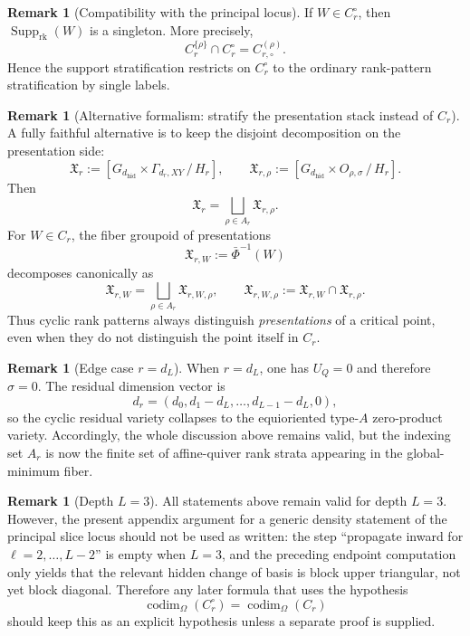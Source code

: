 \documentclass{article}
\newcommand{\Supp}{\operatorname{Supp}}
\theoremstyle{definition}
\newtheorem{remark}[theorem]{Remark}
\begin{document}
\begin{remark}[Compatibility with the principal locus]
If \(W\in C_r^{\circ}\), then \(\Supp_{\mathrm{rk}}(W)\) is a singleton. More precisely,
\[
C_r^{\{\rho\}}\cap C_r^{\circ}=C_{r,\circ}^{(\rho)}.
\]
Hence the support stratification restricts on \(C_r^{\circ}\) to the ordinary
rank-pattern stratification by single labels.
\end{remark}

\begin{remark}[Alternative formalism: stratify the presentation stack instead of \(C_r\)]
A fully faithful alternative is to keep the disjoint decomposition on the presentation side:
\[
\mathfrak X_r
:=
\left[G_{d_{\mathrm{hid}}}\times \Gamma_{d_r,XY}\,/\,H_r\right],
\qquad
\mathfrak X_{r,\rho}
:=
\left[G_{d_{\mathrm{hid}}}\times O_{\rho,\sigma}\,/\,H_r\right].
\]
Then
\[
\mathfrak X_r=\bigsqcup_{\rho\in A_r}\mathfrak X_{r,\rho}.
\]
For \(W\in C_r\), the fiber groupoid of presentations
\[
\mathfrak X_{r,W}:=\bar\Phi^{-1}(W)
\]
decomposes canonically as
\[
\mathfrak X_{r,W}
=
\bigsqcup_{\rho\in A_r}\mathfrak X_{r,W,\rho},
\qquad
\mathfrak X_{r,W,\rho}:=\mathfrak X_{r,W}\cap \mathfrak X_{r,\rho}.
\]
Thus cyclic rank patterns always distinguish \emph{presentations} of a critical point,
even when they do not distinguish the point itself in \(C_r\).
\end{remark}

\begin{remark}[Edge case \(r=d_L\)]
When \(r=d_L\), one has \(U_Q=0\) and therefore \(\sigma=0\). The residual dimension vector is
\[
d_r=(d_0,d_1-d_L,\dots,d_{L-1}-d_L,0),
\]
so the cyclic residual variety collapses to the equioriented type-\(A\) zero-product variety.
Accordingly, the whole discussion above remains valid, but the indexing set \(A_r\) is now the
finite set of affine-quiver rank strata appearing in the global-minimum fiber.
\end{remark}

\begin{remark}[Depth \(L=3\)]
All statements above remain valid for depth \(L=3\). However, the present appendix argument for a
generic density statement of the principal slice locus should not be used as written: the step
``propagate inward for \(\ell=2,\dots,L-2\)'' is empty when \(L=3\), and the preceding endpoint
computation only yields that the relevant hidden change of basis is block upper triangular, not yet
block diagonal. Therefore any later formula that uses the hypothesis
\[
\operatorname{codim}_{\Omega}(C_r^{\circ})=\operatorname{codim}_{\Omega}(C_r)
\]
should keep this as an explicit hypothesis unless a separate proof is supplied.
\end{remark}
\end{document}
